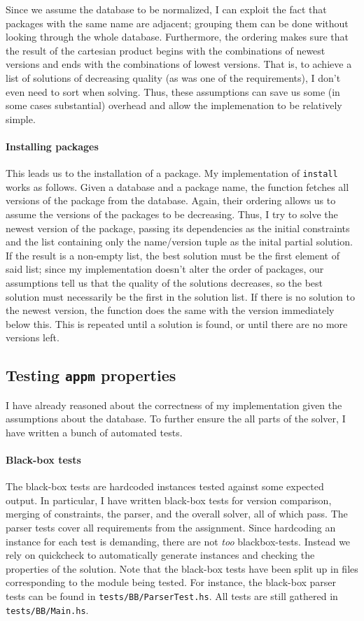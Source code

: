 Since we assume the database to be normalized, I can exploit the fact that packages with the same name are adjacent; grouping them can be done without looking through the whole database. Furthermore, the ordering makes sure that the result of the cartesian product begins with the combinations of newest versions and ends with the combinations of lowest versions. That is, to achieve a list of solutions of decreasing quality (as was one of the requirements), I don't even need to sort when solving. Thus, these assumptions can save us some (in some cases substantial) overhead and allow the implemenation to be relatively simple.


\paragraph{Installing packages}
This leads us to the installation of a package. My implementation of \texttt{install} works as follows. Given a database and a package name, the function fetches all versions of the package from the database. Again, their ordering allows us to assume the versions of the packages to be decreasing. Thus, I try to solve the newest version of the package, passing its dependencies as the initial constraints and the list containing only the name/version tuple as the inital partial solution. If the result is a non-empty list, the best solution must be the first element of said list; since my implementation doesn't alter the order of packages, our assumptions tell us that the quality of the solutions decreases, so the best solution must necessarily be the first in the solution list. If there is no solution to the newest version, the function does the same with the version immediately below this. This is repeated until a solution is found, or until there are no more versions left.


\subsection*{Testing \texttt{appm} properties}
I have already reasoned about the correctness of my implementation given the assumptions about the database. To further ensure the all parts of the solver, I have written a bunch of automated tests.

\paragraph{Black-box tests}
The black-box tests are hardcoded instances tested against some expected output. In particular, I have written black-box tests for version comparison, merging of constraints, the parser, and the overall solver, all of which pass. The parser tests cover all requirements from the assignment. Since hardcoding an instance for each test is demanding, there are not \textit{too} blackbox-tests. Instead we rely on quickcheck to automatically generate instances and checking the properties of the solution. Note that the black-box tests have been split up in files corresponding to the module being tested. For instance, the black-box parser tests can be found in \texttt{tests/BB/ParserTest.hs}. All tests are still gathered in \texttt{tests/BB/Main.hs}.

